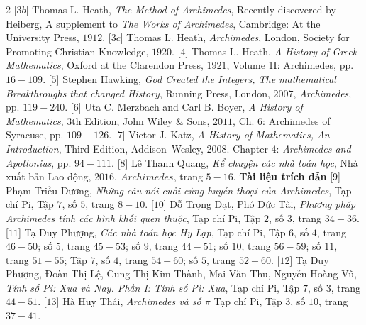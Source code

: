 \begin{multicols}{2}
	[$3b$] Thomas L. Heath, \textit{The Method of Archimedes}, Recently discovered by Heiberg, A supplement to \textit{The Works of Archimedes},  Cambridge: At the University Press, $1912$.
	\vskip 0.1cm
	[$3c$] Thomas L. Heath, \textit{Archimedes}, London, Society for Promoting Christian Knowledge, $1920$.
	\vskip 0.1cm
	[$4$] Thomas L. Heath, \textit{A History of Greek Mathematics}, Oxford at the Clarendon Press, $1921$, Volume 1I: Archimedes, pp. $16-109$.   
	\vskip 0.1cm
	[$5$] Stephen Hawking, \textit{God Created the Integers, The mathematical Breakthroughs that changed History}, Running Press, London, $2007$, \textit{Archimedes}, pp. $119-240$.
	\vskip 0.1cm   
	[$6$] Uta C. Merzbach and Carl B. Boyer, \textit{A
	History of Mathematics}, $3$th Edition, John Wiley \& Sons, $2011$, Ch. $6$: Archimedes of Syracuse, pp. $109-126$.
	\vskip 0.1cm
	[$7$] Victor J. Katz, \textit{A History of Mathematics, An Introduction}, Third Edition, Addison--Wesley, $2008$. Chapter $4$: \textit{Archimedes and Apollonius}, pp. $94-111$.
	\vskip 0.1cm
	[$8$] Lê Thanh Quang, \textit{Kể chuyện các nhà toán học}, Nhà xuất bản Lao động, $2016$, $Archimedes$, trang $5-16$.
	\vskip 0.1cm
	\textbf{\color{lichsutoanhoc}Tài liệu trích dẫn}
	\vskip 0.1cm
	[$9$] Phạm Triều Dương, \textit{Những câu nói cuối cùng huyền thoại của Archimedes}, Tạp chí Pi, Tập $7$, số $5$, trang $8-10$.
	\vskip 0.1cm
	[$10$] Đỗ Trọng Đạt, Phó Đức Tài, \textit{Phương pháp Archimedes tính các hình khối quen thuộc}, Tạp chí Pi, Tập $2$, số $3$, trang $34-36$.
	\vskip 0.1cm
	[$11$] Tạ Duy Phượng, \textit{Các nhà toán học Hy Lạp}, Tạp chí Pi, Tập $6$, số $4$, trang $46-50$; số $5$, trang $45-53$; số $9$, trang $44-51$; số $10$, trang $56-59$; số $11$, trang $51-55$; Tập $7$, số $4$, trang $54-60$; số $5$, trang $52-60$.
	[$12$] Tạ Duy Phượng, Đoàn Thị Lệ, Cung Thị Kim Thành, Mai Văn Thu, Nguyễn Hoàng Vũ, \textit{Tính số Pi: Xưa và Nay. Phần I: Tính số Pi: Xưa}, Tạp chí Pi, Tập $7$, số $3$, trang $44-51$.
	\vskip 0.1cm
	[$13$] Hà Huy Thái, \textit{Archimedes và số  $\pi$} Tạp chí Pi, Tập $3$, số $10$, trang $37-41$.
\end{multicols}